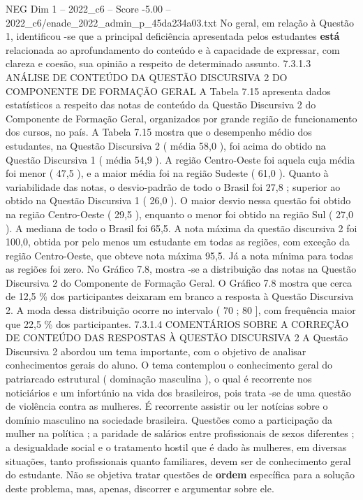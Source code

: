 \begin{textsample}{NEG Dim 1 – 2022\_c6 – Score -5.00 – 2022\_c6/enade\_2022\_admin\_p\_45da234a03.txt}
No geral, em relação à Questão 1, identificou -se que a principal deficiência apresentada pelos estudantes \textbf{está} relacionada ao aprofundamento do conteúdo e à capacidade de expressar, com clareza e coesão, sua opinião a respeito de determinado assunto. 7.3.1.3 ANÁLISE DE CONTEÚDO DA QUESTÃO DISCURSIVA 2 DO COMPONENTE DE FORMAÇÃO GERAL A Tabela 7.15 apresenta dados estatísticos a respeito das notas de conteúdo da Questão Discursiva 2 do Componente de Formação Geral, organizados por grande região de funcionamento dos cursos, no país.
A Tabela 7.15 mostra que o desempenho médio dos estudantes, na Questão Discursiva 2 ( média 58,0 ), foi acima do obtido na Questão Discursiva 1 ( média 54,9 ).
A região Centro-Oeste foi aquela cuja média foi menor ( 47,5 ), e a maior média foi na região Sudeste ( 61,0 ).
Quanto à variabilidade das notas, o desvio-padrão de todo o Brasil foi 27,8 ; superior ao obtido na Questão Discursiva 1 ( 26,0 ).
O maior desvio nessa questão foi obtido na região Centro-Oeste ( 29,5 ), enquanto o menor foi obtido na região Sul ( 27,0 ).
A mediana de todo o Brasil foi 65,5.
A nota máxima da questão discursiva 2 foi 100,0, obtida por pelo menos um estudante em todas as regiões, com exceção da região Centro-Oeste, que obteve nota máxima 95,5.
Já a nota mínima para todas as regiões foi zero.
No Gráfico 7.8, mostra -se a distribuição das notas na Questão Discursiva 2 do Componente de Formação Geral.
O Gráfico 7.8 mostra que cerca de 12,5 \% dos participantes deixaram em branco a resposta à Questão Discursiva 2.
A moda dessa distribuição ocorre no intervalo ( 70 ; 80 ], com frequência maior que 22,5 \% dos participantes. 7.3.1.4 COMENTÁRIOS SOBRE A CORREÇÃO DE CONTEÚDO DAS RESPOSTAS À QUESTÃO DISCURSIVA 2 A Questão Discursiva 2 abordou um tema importante, com o objetivo de analisar conhecimentos gerais do aluno.
O tema contemplou o conhecimento geral do patriarcado estrutural ( dominação masculina ), o qual é recorrente nos noticiários e um infortúnio na vida dos brasileiros, pois trata -se de uma questão de violência contra as mulheres.
É recorrente assistir ou ler notícias sobre o domínio masculino na sociedade brasileira.
Questões como a participação da mulher na política ; a paridade de salários entre profissionais de sexos diferentes ; a desigualdade social e o tratamento hostil que é dado às mulheres, em diversas situações, tanto profissionais quanto familiares, devem ser de conhecimento geral do estudante.
Não se objetiva tratar questões de \textbf{ordem} específica para a solução deste problema, mas, apenas, discorrer e argumentar sobre ele.

\end{textsample}
